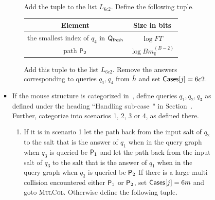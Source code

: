 \begin{enumerate}
\begin{enumerate}
\begin{itemize}
\begin{itemize}
\begin{enumerate}
\begin{center}
\begin{tabular}{|c|c|}
          \end{tabular}
          \end{center}
        Add the tuple to the list $L_{6c2}$. Define the following tuple.
          \begin{center}
            \begin{tabular}{|c|c|}\hline
        
            Element & Size in bits \\ \hline\hline
                
            the smallest index  of $q_4$ in $\qf$ & $\log FT$   \\\hline
                    
            path $\pth_2$ & $ \log Bm_0^{(B-2)}$\\\hline
            
            \end{tabular}
            \end{center}
    Add this tuple to the list $L_{6c2}$. Remove the answers corresponding to queries $q_1,q_4$ from $\hrest$ and set $\cs[j]=6c2$.
    \end{enumerate}
    \item If the mouse structure is categorized in~, define queries $q_1,q_2,q_3$ as defined under the heading ``Handling sub-case~" in Section~. Further, categorize into scenarios 1, 2, 3 or 4, as defined there. 
    \begin{enumerate}
    \item If it is in scenario 1 let the path back from the input salt of $q_2$ to the salt that is the answer of $q_1$ when in the query graph when $q_3$ is queried be $\mathsf{P}_1$ and let the path back from the input salt of $q_3$ to the salt that is the answer of $q_1$ when in the query graph when $q_3$ is queried be $\pth_2$
     If there is a large multi-collision encountered either $\mathsf{P}_1$ or $\pth_2$, set $\mathsf{Cases}[j]=6m$ and goto \textsc{MulCol}.
    Otherwise define the following tuple.
    \begin{center}
      \begin{tabular}{|c|c|}\hline
  

\end{tabular}
\end{center}
\end{enumerate}
\end{itemize}
\end{itemize}
\end{enumerate}
\end{enumerate}
